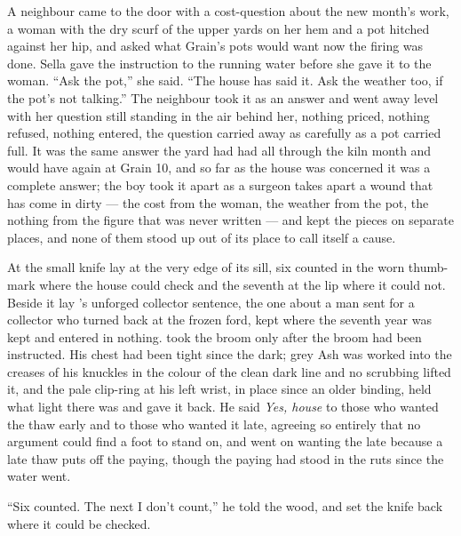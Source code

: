 A neighbour came to the door with a cost-question about the new month's work, a woman with the dry scurf of the upper yards on her hem and a pot hitched against her hip, and asked what Grain's pots would want now the firing was done. Sella gave the instruction to the running water before she gave it to the woman. “Ask the pot,” she said. “The house has said it. Ask the weather too, if the pot's not talking.” The neighbour took it as an answer and went away level with her question still standing in the air behind her, nothing priced, nothing refused, nothing entered, the question carried away as carefully as a pot carried full. It was the same answer the yard had had all through the kiln month and would have again at Grain 10, and so far as the house was concerned it was a complete answer; the boy took it apart as a surgeon takes apart a wound that has come in dirty --- the cost from the woman, the weather from the pot, the nothing from the figure that was never written --- and kept the pieces on separate places, and none of them stood up out of its place to call itself a cause.

\scenebreak

At  the small knife lay at the very edge of its sill, six counted in the worn thumb-mark where the house could check and the seventh at the lip where it could not. Beside it lay 's unforged collector sentence, the one about a man sent for a collector who turned back at the frozen ford, kept where the seventh year was kept and entered in nothing.  took the broom only after the broom had been instructed. His chest had been tight since the dark; grey Ash was worked into the creases of his knuckles in the colour of the clean dark line and no scrubbing lifted it, and the pale clip-ring at his left wrist, in place since an older binding, held what light there was and gave it back. He said \emph{Yes, house} to those who wanted the thaw early and to those who wanted it late, agreeing so entirely that no argument could find a foot to stand on, and went on wanting the late because a late thaw puts off the paying, though the paying had stood in the ruts since the water went.

“Six counted. The next I don't count,” he told the wood, and set the knife back where it could be checked.

